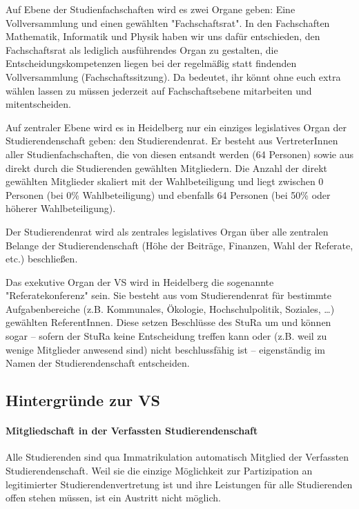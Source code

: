 Auf Ebene der
Studienfachschaften wird es zwei Organe geben: Eine Vollversammlung und
einen gewählten "Fachschaftsrat". In den Fachschaften Mathematik,
Informatik und Physik haben wir uns dafür entschieden, den Fachschaftsrat
als lediglich ausführendes Organ zu gestalten, die Entscheidungskompetenzen
liegen bei der regelmäßig statt findenden Vollversammlung (Fachschaftssitzung).
Da bedeutet, ihr könnt ohne euch extra wählen lassen zu müssen jederzeit
auf Fachschaftsebene mitarbeiten und mitentscheiden.

Auf zentraler Ebene wird es in Heidelberg nur ein einziges legislatives
Organ der Studierendenschaft geben: den Studierendenrat. Er besteht aus
VertreterInnen aller Studienfachschaften, die von diesen entsandt werden
(64 Personen) sowie aus direkt durch die Studierenden gewählten Mitgliedern.
Die Anzahl der direkt gewählten Mitglieder skaliert mit der Wahlbeteiligung
und liegt zwischen 0 Personen (bei 0\% Wahlbeteiligung) und ebenfalls 64 Personen
(bei 50\% oder höherer Wahlbeteiligung).

Der Studierendenrat wird als zentrales legislatives Organ über alle
zentralen Belange der Studierendenschaft (Höhe der Beiträge, Finanzen,
Wahl der Referate, etc.) beschließen.

Das exekutive Organ der VS wird in Heidelberg die sogenannte "Referatekonferenz" sein.
Sie besteht aus vom Studierendenrat für bestimmte Aufgabenbereiche (z.B.
Kommunales, Ökologie, Hochschulpolitik, Soziales, \dots) gewählten
ReferentInnen. Diese setzen Beschlüsse des StuRa um und können sogar --
sofern der StuRa keine Entscheidung treffen kann oder (z.B. weil zu
wenige Mitglieder anwesend sind) nicht beschlussfähig ist --
eigenständig im Namen der Studierendenschaft entscheiden.

\subsection{Hintergründe zur VS}

\paragraph{Mitgliedschaft in der Verfassten Studierendenschaft}

Alle Studierenden sind qua Immatrikulation automatisch Mitglied der
Verfassten Studierendenschaft. Weil sie die einzige Möglichkeit zur
Partizipation an legitimierter Studierendenvertretung ist und ihre
Leistungen für alle Studierenden offen stehen müssen, ist ein Austritt
nicht möglich.

